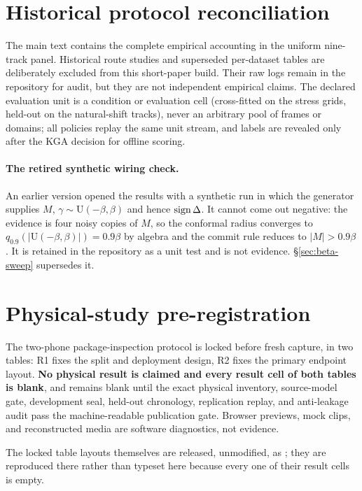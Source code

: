 \section{Historical protocol reconciliation}\label{app:supp-exp}
The main text contains the complete empirical accounting in the uniform nine-track panel.
Historical route studies and superseded per-dataset tables are deliberately excluded from this
short-paper build. Their raw logs remain in the repository for
audit, but they are not independent empirical claims. The declared evaluation unit is a condition
or evaluation cell (cross-fitted on the stress grids, held-out on the natural-shift tracks), never
an arbitrary pool of frames or domains; all policies replay the same unit
stream, and labels are revealed only after the KGA decision for offline scoring.

\paragraph{The retired synthetic wiring check.} An earlier version opened the results with a
synthetic run in which the generator supplies $M$, $\gamma\sim\mathrm U(-\beta,\beta)$ and hence
$\operatorname{sign}\Delta$. It cannot come out negative: the evidence is four noisy copies of $M$, so the
conformal radius converges to $q_{0.9}(|\mathrm U(-\beta,\beta)|)=0.9\beta$ by algebra and the
commit rule reduces to $|M|>0.9\beta$. It is retained in the repository as a unit test and is not
evidence. \S\ref{sec:beta-sweep} supersedes it.


\section{Physical-study pre-registration}\label{app:edge-physical}
The two-phone package-inspection protocol is locked before fresh capture, in two tables: R1 fixes
the split and deployment design, R2 fixes the primary endpoint layout. \textbf{No physical result is
claimed and every result cell of both tables is blank}, and remains blank until the exact physical
inventory, source-model gate, development seal, held-out chronology, replication replay, and
anti-leakage audit pass the machine-readable publication gate. Browser previews, mock clips, and
reconstructed media are software diagnostics, not evidence.

The locked table layouts themselves are released, unmodified, as
; they are reproduced there rather
than typeset here because every one of their result cells is empty.


